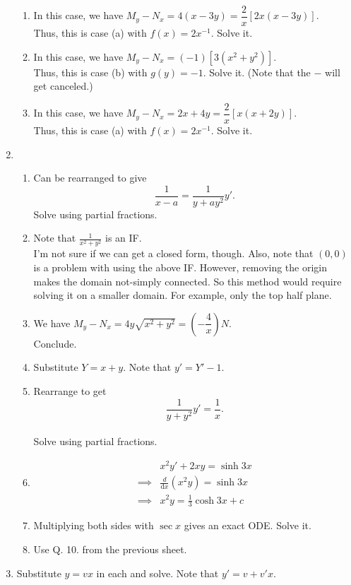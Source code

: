 \documentclass[12pt]{article}
\theoremstyle{definition}
\numberwithin{thm}{section}
\newcommand{\dd}{{\mathrm d}}
\begin{document}
\begin{enumerate}[leftmargin=*, label = Q.\arabic*.]
	\begin{enumerate}[label = (\roman*)] 
		\item In this case, we have $M_y - N_x = 4(x - 3y) = \dfrac{2}{x}[2x(x - 3y)].$\\
		Thus, this is case (a) with $f(x) = 2x^{-1}.$ Solve it.
		\item In this case, we have $M_y - N_x = (-1)[3(x^2 + y^2)].$\\
		Thus, this is case (b) with $g(y) = -1.$ Solve it. (Note that the $-$ will get canceled.)
		\item In this case, we have $M_y - N_x = 2x + 4y = \dfrac{2}{x}[x(x + 2y)].$\\
		Thus, this is case (a) with $f(x) = 2x^{-1}.$ Solve it.		
	\end{enumerate}
	\item 
	\begin{enumerate}[label = (\roman*)] 
		\item Can be rearranged to give
		\[\frac{1}{x - a} = \frac{1}{y + ay^2}y'.\]
		Solve using partial fractions.
		\item Note that $\frac{1}{x^2 + y^2}$ is an IF.\\
		I'm not sure if we can get a closed form, though. Also, note that $(0, 0)$ is a problem with using the above IF. However, removing the origin makes the domain not-simply connected. So this method would require solving it on a smaller domain. For example, only the top half plane.
		\item We have $M_y - N_x = 4y\sqrt{x^2 + y^2} = \left(-\dfrac{4}{x}\right)N.$\\
		Conclude.
		\item Substitute $Y = x + y.$ Note that $y' = Y' - 1.$
		\item Rearrange to get
		\[\frac{1}{y + y^2}y' = \frac{1}{x}.\]\\
		Solve using partial fractions.
		\item 
		\begin{align*} 
			&x^2y' + 2xy = \sinh 3x\\
			\implies &\frac{d}{\dd x}(x^2y) = \sinh 3x\\
			\implies &x^2y = \frac{1}{3}\cosh 3x + c
		\end{align*}
		\item Multiplying both sides with $\sec x$ gives an exact ODE. Solve it.
		\item Use Q. 10. from the previous sheet.
	\end{enumerate}
	\item Substitute $y = vx$ in each and solve. Note that $y' = v + v'x.$

\end{enumerate}
\end{document}
